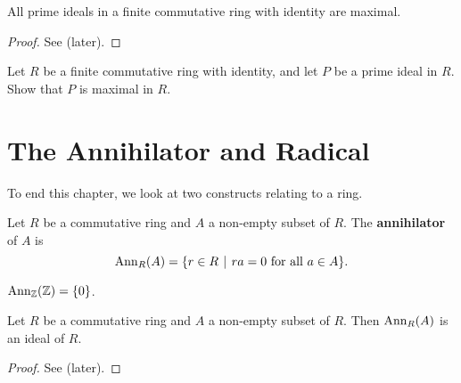 \begin{corollary}\label{corollary-prime-ideal-is-maximal-in-finite-commutative-ring-with-identity}
    All prime ideals in a finite commutative ring with identity are maximal.
\end{corollary}
\begin{proof}
    See  (later).
\end{proof}
\begin{exercise}\label{exercise-prime-ideal-is-maximal-in-finite-commutative-ring-with-identity}
    Let $R$ be a finite commutative ring with identity, and let $P$ be a prime ideal in $R$. Show that $P$ is maximal in $R$.
\end{exercise}

\section{The Annihilator and Radical}
To end this chapter, we look at two constructs relating to a ring.
\begin{definition}
    Let $R$ be a commutative ring and $A$ a non-empty subset of $R$. The \textbf{annihilator} of $A$ is
    \[
        \Ann{R}{A} = \{r \in R \vert ra = 0 \text{ for all } a \in A\}.
    \]
\end{definition}
\begin{example}
    $\mathrm{Ann}_{\mathbb{Z}}(\mathbb{Z}) = \{0\}$.
\end{example}
\begin{proposition}
    Let $R$ be a commutative ring and $A$ a non-empty subset of $R$. Then $\mathrm{Ann}_{R}(A)$ is an ideal of $R$.
\end{proposition}
\begin{proof}
    See  (later).
\end{proof}


